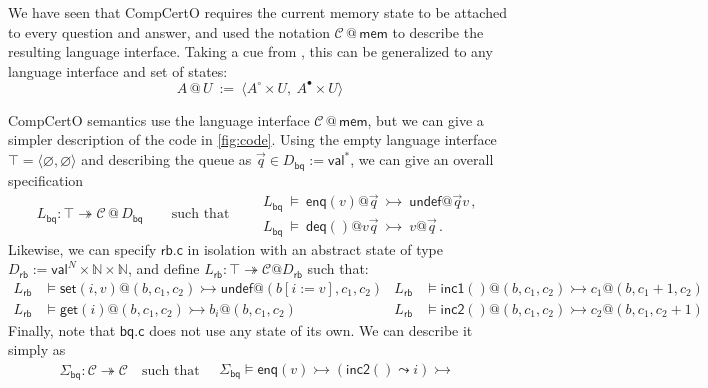 \documentclass[acmsmall,screen,review,anonymous]{acmart}
\newcommand{\kw}[1]{\ensuremath{ \mathsf{#1} }}
\newcommand{\que}{\circ}
\newcommand{\ans}{\bullet}
\begin{document}

We have seen that CompCertO
requires the current memory state to be attached
to every question and answer,
and used the notation $\mathcal{C} \mathbin@ \kw{mem}$
to describe the resulting language interface.
Taking a cue from \citet{rbgs-cal},
this can be generalized to any
language interface and set of states:
\[
  A \mathbin@ U \: := \:
    \langle A^\que \times U, \: A^\ans \times U \rangle
\]


\begin{example} \label{ex:abspec} %
CompCertO semantics use the language interface
$\mathcal{C} \mathbin@ \kw{mem}$,
but we can give
a simpler description of the code in \autoref{fig:code}.
Using the empty language interface $\top = \langle \varnothing, \varnothing \rangle$
and describing the queue as $\vec{q} \in D_\kw{bq} := \kw{val}^*$,
we can give an overall specification
\[
  L_\kw{bq} : \top \twoheadrightarrow \mathcal{C} \mathbin@ D_\kw{bq}
  \qquad
  \text{such that}
  \qquad
  \begin{array}{l}
    L_\kw{bq} \:\vDash\:
      \kw{enq}(v) @ \vec{q}
      \:\rightarrowtail\:
      \kw{undef} @ \vec{q}v
      \,,
    \\
    L_\kw{bq} \:\vDash\:
      \kw{deq}() @ v\vec{q}
      \:\rightarrowtail\:
      v @ \vec{q}
      \,.
  \end{array}
\]
Likewise, we can specify $\kw{rb.c}$ in isolation
with an abstract state of type
$D_\kw{rb} := \kw{val}^N \times \mathbb{N} \times \mathbb{N}$,
and define
$L_\kw{rb} : \top \twoheadrightarrow \mathcal{C}@D_\kw{rb}$
such that:
{%
\begin{align*}
  L_\kw{rb} &\vDash
    \kw{set}(i, v)@(b, c_1, c_2) \rightarrowtail
    \kw{undef}@(b[i := v], c_1, c_2) &
  L_\kw{rb} &\vDash
    \kw{inc1}()@(b, c_1, c_2) \rightarrowtail
    c_1@(b, c_1\!\!+\!\!1, c_2) \\
  L_\kw{rb} &\vDash
    \kw{get}(i)@(b, c_1, c_2) \rightarrowtail
    b_i@(b, c_1, c_2) &
  L_\kw{rb} &\vDash
    \kw{inc2}()@(b, c_1, c_2) \rightarrowtail
    c_2@(b, c_1, c_2\!\!+\!\!1)
\end{align*}
}
Finally,
note that $\kw{bq.c}$ does not use any state of its own.
We can describe it simply as
\[
  \Sigma_\kw{bq} : \mathcal{C} \twoheadrightarrow \mathcal{C}
  \quad\text{such that}\quad
  \begin{array}{l}
    \Sigma_\kw{bq} \vDash
      \kw{enq}(v) \rightarrowtail
      (\kw{inc2}() \leadsto i) \rightarrowtail

\end{array}\]
\end{example}
\end{document}
